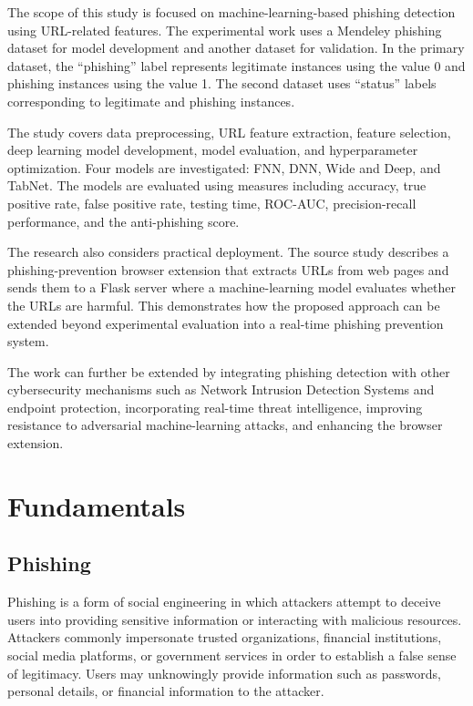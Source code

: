 \documentclass[12pt,a4paper]{report}
\begin{document}
The scope of this study is focused on machine-learning-based
phishing detection using URL-related features. The experimental
work uses a Mendeley phishing dataset for model development and
another dataset for validation. In the primary dataset, the
``phishing'' label represents legitimate instances using the value
0 and phishing instances using the value 1. The second dataset uses
``status'' labels corresponding to legitimate and phishing
instances.

The study covers data preprocessing, URL feature extraction,
feature selection, deep learning model development, model
evaluation, and hyperparameter optimization. Four models are
investigated: FNN, DNN, Wide and Deep, and TabNet. The models are
evaluated using measures including accuracy, true positive rate,
false positive rate, testing time, ROC-AUC, precision-recall
performance, and the anti-phishing score.

The research also considers practical deployment. The source study
describes a phishing-prevention browser extension that extracts
URLs from web pages and sends them to a Flask server where a
machine-learning model evaluates whether the URLs are harmful.
This demonstrates how the proposed approach can be extended beyond
experimental evaluation into a real-time phishing prevention
system.

The work can further be extended by integrating phishing detection
with other cybersecurity mechanisms such as Network Intrusion
Detection Systems and endpoint protection, incorporating
real-time threat intelligence, improving resistance to adversarial
machine-learning attacks, and enhancing the browser extension.



\chapter{Fundamentals}

\section{Phishing}

Phishing is a form of social engineering in which attackers attempt
to deceive users into providing sensitive information or interacting
with malicious resources. Attackers commonly impersonate trusted
organizations, financial institutions, social media platforms, or
government services in order to establish a false sense of
legitimacy. Users may unknowingly provide information such as
passwords, personal details, or financial information to the
attacker.
\end{document}
